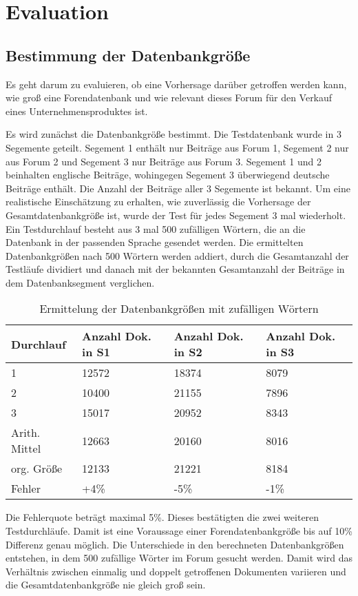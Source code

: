 \section{Evaluation}
\subsection{Bestimmung der Datenbankgröße}

Es geht darum zu evaluieren, ob eine Vorhersage darüber getroffen werden kann, wie groß eine Forendatenbank und wie relevant dieses Forum für den Verkauf eines Unternehmensproduktes ist.

Es wird zunächst die Datenbankgröße bestimmt. Die Testdatenbank wurde in 3 Segemente geteilt. Segement 1 enthält nur Beiträge aus Forum 1, Segement 2 nur aus Forum 2 und Segement 3 nur Beiträge aus Forum 3. 
Segement 1 und 2 beinhalten englische Beiträge, wohingegen Segement 3 überwiegend deutsche Beiträge enthält. Die Anzahl der Beiträge aller 3 Segemente ist bekannt. Um eine realistische Einschätzung zu erhalten, wie zuverlässig die Vorhersage der Gesamtdatenbankgröße ist, wurde der Test für jedes Segement 3 mal wiederholt. Ein Testdurchlauf besteht aus 3 mal 500 zufälligen Wörtern, die an die Datenbank in der passenden Sprache gesendet werden. Die ermittelten Datenbankgrößen nach 500 Wörtern werden addiert, durch die Gesamtanzahl der Testläufe dividiert und danach mit der bekannten Gesamtanzahl der Beiträge in dem Datenbanksegment verglichen.

\begin{table}[h!]
\begin{tabular}{ | p{3cm} | p{3cm} | p{3cm}| p{3cm} |} \hline
\textbf{Durchlauf} & \textbf{Anzahl Dok. in S1} & \textbf{Anzahl Dok. in S2} & \textbf{Anzahl Dok. in S3} \\ \hline
1 & 12572 & 18374 & 8079 \\ \hline
2 & 10400 & 21155 & 7896 \\ \hline
3 & 15017 & 20952 & 8343 \\ \hline
Arith. Mittel & 12663 & 20160 & 8016 \\ \hline
org. Größe & 12133 & 21221 & 8184 \\ \hline
Fehler & +4\% & -5\% & -1\% \\ \hline
\end{tabular}
\caption{Ermittelung der Datenbankgrößen mit zufälligen Wörtern}
\end{table}

Die Fehlerquote beträgt maximal 5\%. Dieses bestätigten die zwei weiteren Testdurchläufe. Damit ist eine Voraussage einer Forendatenbankgröße bis auf 10\% Differenz genau möglich. Die Unterschiede in den berechneten Datenbankgrößen entstehen, in dem 500 zufällige Wörter im Forum gesucht werden. Damit wird das Verhältnis zwischen einmalig und doppelt getroffenen Dokumenten variieren und die Gesamtdatenbankgröße nie gleich groß sein.
